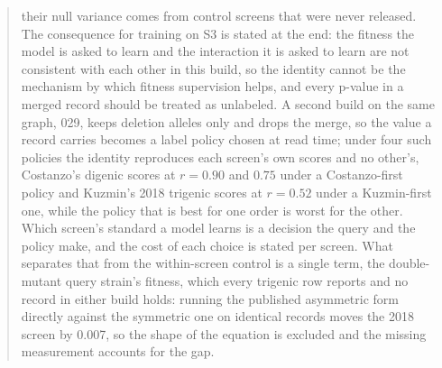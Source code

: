 \documentclass[10pt,a4paper]{article}
\begin{document}
\begin{abstract}
their null variance comes from control screens that were never released. The
consequence for training on S3 is stated at the end: the fitness the model is asked
to learn and the interaction it is asked to learn are not consistent with each other
in this build, so the identity cannot be the mechanism by which fitness supervision
helps, and every p-value in a merged record should be treated as unlabeled. A second
build on the same graph, 029, keeps deletion alleles only and drops the merge, so the
value a record carries becomes a label policy chosen at read time; under four such
policies the identity reproduces each screen's own scores and no other's, Costanzo's
digenic scores at $r = 0.90$ and $0.75$ under a Costanzo-first policy and Kuzmin's 2018
trigenic scores at $r = 0.52$ under a Kuzmin-first one, while the policy that is best for
one order is worst for the other. Which screen's standard a model learns is a decision
the query and the policy make, and the cost of each choice is stated per screen. What
separates that from the within-screen control is a single term, the double-mutant query
strain's fitness, which every trigenic row reports and no record in either build holds:
running the published asymmetric form directly against the symmetric one on identical
records moves the 2018 screen by 0.007, so the shape of the equation is excluded and the
missing measurement accounts for the gap.
\end{abstract}

\vspace{0.5em}
\tccontents
\clearpage










\end{document}
